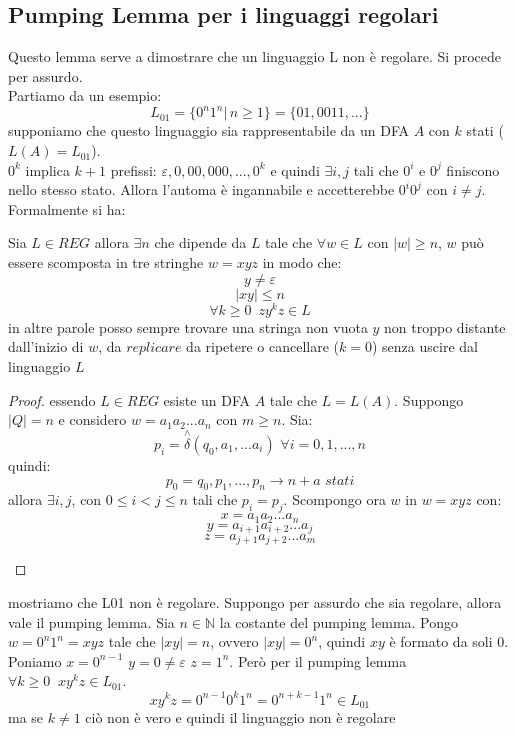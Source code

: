 \documentclass[a4paper,12pt, oneside]{book}
\begin{document}
\subsection{Pumping Lemma per i linguaggi regolari}
Questo lemma serve a dimostrare che un linguaggio L non è regolare. Si procede per assurdo.\\
Partiamo da un esempio:
$$L_{01}=\{0^n1^n|\,n\geq 1\}=\{01,0011,...\}$$
supponiamo che questo linguaggio sia rappresentabile da un DFA $A$ con $k$ stati ($L(A)=L_{01}$).\\
$0^k$ implica $k+1$ prefissi: $\varepsilon,0,00,000,...,0^k$ e quindi $\exists i,j$ tali che $0^i$ e $0^j$ finiscono nello stesso stato. Allora l'automa è ingannabile e accetterebbe $0^i0^j$ con $i\neq j$.\\
Formalmente si ha:
\begin{teorema}
Sia $L\in REG$ allora $\exists n$ che dipende da $L$ tale che $\forall w\in L$ con $|w|\geq n$, $w$ può essere scomposta in tre stringhe $w=xyz$ in modo che:
$$y\neq \varepsilon$$
$$|xy|\leq n$$
$$\forall k\geq 0\,\,\, zy^kz\in L$$
in altre parole posso sempre trovare una stringa non vuota $y$ non troppo distante dall'inizio di $w$, da $replicare$ da ripetere o cancellare ($k=0$) senza uscire dal linguaggio $L$
\end{teorema}
\begin{proof}
essendo $L\in REG$ esiste un DFA $A$ tale che $L=L(A)$. Suppongo $|Q|=n$ e considero $w=a_1a_2...a_n$ con $m\geq n$. Sia:
$$p_i=\stackrel{\wedge}{\delta}(q_0,a_1,...a_i)\,\,\forall i=0,1,...,n$$
quindi:
$$p_0=q_0,p_1,...,p_n\to n+a\,\,stati$$
allora $\exists i,j$, con $0\leq i<j\leq n$ tali che $p_i=p_j$. Scompongo ora $w$ in $w=xyz$ con:
$$x=a_1a_2...a_n$$
$$y=a_{i+1}a_{i+2}...a_j$$
$$z=a_{j+1}a_{j+2}...a_m$$
\begin{center}
\end{center}
\end{proof}
\begin{esempio}
mostriamo che L01 non è regolare. Suppongo per assurdo che sia regolare, allora vale il pumping lemma. Sia $n\in\mathbb{N}$ la costante del pumping lemma. Pongo $w=0^n1^n=xyz$ tale che $|xy|=n$, ovvero $|xy|=0^n$, quindi $xy$ è formato da soli 0. Poniamo $x=0^{n-1}\,\,y=0\neq \varepsilon\,\, z=1^n$. Però per il pumping lemma $\forall k\geq 0\,\,\ xy^kz\in L_{01}$.
$$xy^kz=0^{n-1}0^k1^n=0^{n+k-1}1^n\in L_{01}$$
ma se $k\neq 1$ ciò non è vero e quindi il linguaggio non è regolare
\end{esempio}
\end{document}
